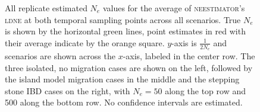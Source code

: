 \begin{landscape}
\begin{figure}[ht]
\centering
{}
\caption[All replicate estimated $N_e$ values for the average of \textsc{neestimator}'s \textsc{ldne} at both temporal sampling points across all scenarios.]{All replicate estimated $N_e$ values for the average of \textsc{neestimator}'s \textsc{ldne} at both temporal sampling points across all scenarios. True $N_e$ is shown by the horizontal green lines, point estimates in red with their average indicate by the orange square. $y$-axis is $\frac{1}{2 N_e}$ and scenarios are shown across the $x$-axis, labeled in the center row. The three isolated, no migration cases are shown on the left, followed by the island model migration cases in the middle and the stepping stone IBD cases on the right, with $N_e = 50$ along the top row and 500 along the bottom row. No confidence intervals are estimated.}
\label{fig:supp_avg2}
\end{figure}



\end{landscape}
